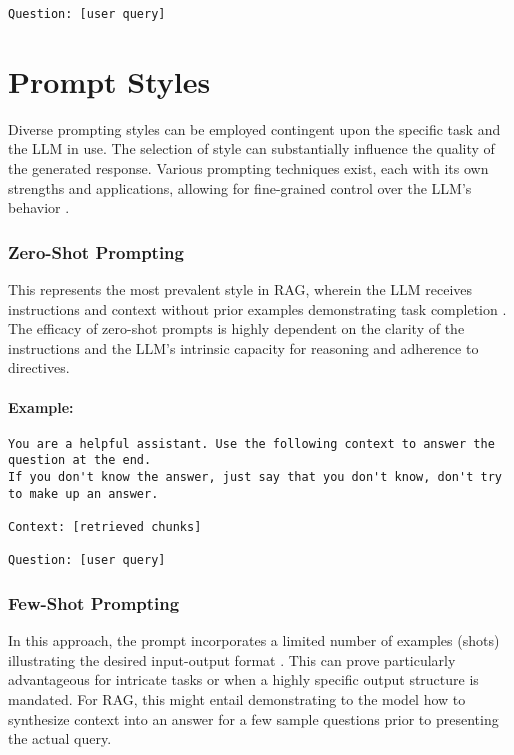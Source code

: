 \texttt{Question: [user query]}

\section{Prompt Styles}
Diverse prompting styles can be employed contingent upon the specific task and the LLM in use. The selection of style can substantially influence the quality of the generated response. Various prompting techniques exist, each with its own strengths and applications, allowing for fine-grained control over the LLM's behavior \autocite{liu2023geval}.

\subsubsection{Zero-Shot Prompting}
This represents the most prevalent style in RAG, wherein the LLM receives instructions and context without prior examples demonstrating task completion \autocite{brown2020language}. The efficacy of zero-shot prompts is highly dependent on the clarity of the instructions and the LLM's intrinsic capacity for reasoning and adherence to directives.

\paragraph{Example:}
\begin{verbatim}
You are a helpful assistant. Use the following context to answer the question at the end.
If you don't know the answer, just say that you don't know, don't try to make up an answer.

Context: [retrieved chunks]

Question: [user query]
\end{verbatim}
    
    \subsubsection{Few-Shot Prompting}
In this approach, the prompt incorporates a limited number of examples (shots) illustrating the desired input-output format \autocite{brown2020language}. This can prove particularly advantageous for intricate tasks or when a highly specific output structure is mandated. For RAG, this might entail demonstrating to the model how to synthesize context into an answer for a few sample questions prior to presenting the actual query.

